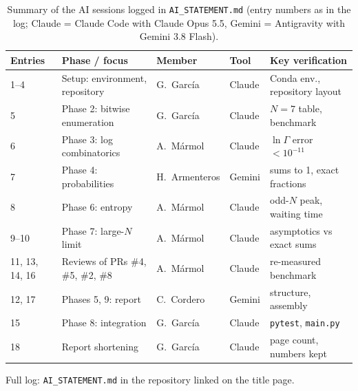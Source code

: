 \documentclass[11pt,a4paper]{article}
\begin{document}
\begin{table}[htbp]\centering\footnotesize
\caption{Summary of the AI sessions logged in \texttt{AI\_STATEMENT.md} (entry numbers as in the log; Claude = Claude Code with Claude Opus 5.5, Gemini = Antigravity with Gemini 3.8 Flash).}\label{tab:ai_audit}
\begin{tabular}{@{}lllll@{}}
\toprule
Entries & Phase / focus & Member & Tool & Key verification \\
\midrule
1--4 & Setup: environment, repository & G.~Garc\'ia & Claude & Conda env., repository layout \\
5 & Phase 2: bitwise enumeration & G.~Garc\'ia & Claude & $N=7$ table, benchmark \\
6 & Phase 3: log combinatorics & A.~M\'armol & Claude & $\ln\Gamma$ error $<10^{-11}$ \\
7 & Phase 4: probabilities & H.~Armenteros & Gemini & sums to 1, exact fractions \\
8 & Phase 6: entropy & A.~M\'armol & Claude & odd-$N$ peak, waiting time \\
9--10 & Phase 7: large-$N$ limit & A.~M\'armol & Claude & asymptotics vs exact sums \\
11, 13, 14, 16 & Reviews of PRs \#4, \#5, \#2, \#8 & A.~M\'armol & Claude & re-measured benchmark \\
12, 17 & Phases 5, 9: report & C.~Cordero & Gemini & structure, assembly \\
15 & Phase 8: integration & G.~Garc\'ia & Claude & \texttt{pytest}, \texttt{main.py} \\
18 & Report shortening & G.~Garc\'ia & Claude & page count, numbers kept \\
\bottomrule
\end{tabular}
\end{table}

\noindent Full log: \texttt{AI\_STATEMENT.md} in the repository linked on the title page.
\end{document}
